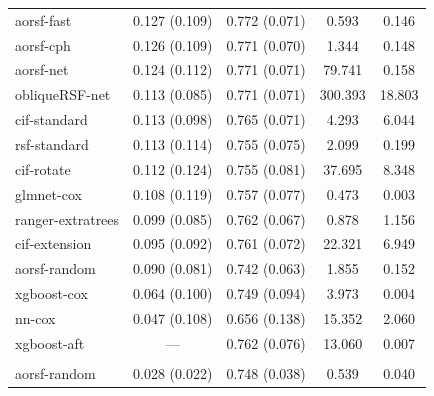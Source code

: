 \documentclass{article}\usepackage[]{graphicx}\usepackage[]{xcolor}
\newenvironment{knitrout}{}{} %
\begin{document}
\begin{knitrout}
\begin{longtable}[t]{lcccc}
\endfoot
\bottomrule
\endlastfoot
\addlinespace[0.3em]
\multicolumn{5}{l}{\textit{\textbf{Overall}}}\\
\hline
\hspace{1em}aorsf-fast & 0.127 (0.109) & 0.772 (0.071) & 0.593 & 0.146\\
\hspace{1em}aorsf-cph & 0.126 (0.109) & 0.771 (0.070) & 1.344 & 0.148\\
\hspace{1em}aorsf-net & 0.124 (0.112) & 0.771 (0.071) & 79.741 & 0.158\\
\hspace{1em}obliqueRSF-net & 0.113 (0.085) & 0.771 (0.071) & 300.393 & 18.803\\
\hspace{1em}cif-standard & 0.113 (0.098) & 0.765 (0.071) & 4.293 & 6.044\\
\hspace{1em}rsf-standard & 0.113 (0.114) & 0.755 (0.075) & 2.099 & 0.199\\
\hspace{1em}cif-rotate & 0.112 (0.124) & 0.755 (0.081) & 37.695 & 8.348\\
\hspace{1em}glmnet-cox & 0.108 (0.119) & 0.757 (0.077) & 0.473 & 0.003\\
\hspace{1em}ranger-extratrees & 0.099 (0.085) & 0.762 (0.067) & 0.878 & 1.156\\
\hspace{1em}cif-extension & 0.095 (0.092) & 0.761 (0.072) & 22.321 & 6.949\\
\hspace{1em}aorsf-random & 0.090 (0.081) & 0.742 (0.063) & 1.855 & 0.152\\
\hspace{1em}xgboost-cox & 0.064 (0.100) & 0.749 (0.094) & 3.973 & 0.004\\
\hspace{1em}nn-cox & 0.047 (0.108) & 0.656 (0.138) & 15.352 & 2.060\\
\hspace{1em}xgboost-aft & --- & 0.762 (0.076) & 13.060 & 0.007\\
\addlinespace[0.3em]
\multicolumn{5}{l}{\textit{\textbf{ACTG 320; AIDS diagnosis, n = 1151, p = 12}}}\\
\hline
\hspace{1em}aorsf-random & 0.028 (0.022) & 0.748 (0.038) & 0.539 & 0.040\\

\end{longtable}
\end{knitrout}
\end{document}
